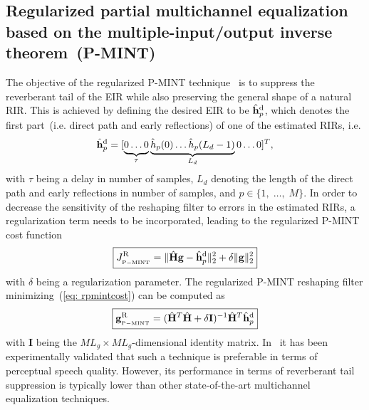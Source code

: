 \documentclass{article}
\begin{document}
\subsection{Regularized partial multichannel equalization based on the multiple-input/output inverse theorem~(P-MINT)}
The objective of the regularized P-MINT technique~\cite{Kodrasi_IWAENC_2012} is to suppress the reverberant tail of the EIR while also preserving the general shape of a natural RIR.
This is achieved by defining the desired EIR to be $\hat{\mathbf{h}}_p^{\rm d}$, which denotes the first part~(i.e. direct path and early reflections) of one of the estimated RIRs, i.e.
\begin{equation}
\hat{\mathbf{h}}_{p}^{\rm d} = [\underbrace{0\phantom{\rlap{$(L_d-1)$}} \ldots 0 }_{\tau} \underbrace{\hat{h}_p(0) \ldots \hat{h}_p(L_d-1)}_{L_d} 0 \ldots 0 ]^{T},
\end{equation}
with $\tau$ being a delay in number of samples, $L_d$ denoting the length of the direct path and early reflections in number of samples, and $p \in \{1, \; \ldots, \; M\}$.
In order to decrease the sensitivity of the reshaping filter to errors in the estimated RIRs, a regularization term needs to be incorporated, leading to the regularized P-MINT cost function
\begin{equation}
  \label{eq: rpmintcost}
  \boxed{J_{_{\rm P-MINT}}^{{\rm R}} = \|\hat{\mathbf{H}}\mathbf{g} - \hat{\mathbf{h}}_p^{\rm d}\|_2^2 + \delta \|\mathbf{g}\|_2^2}
\end{equation}
with $\delta$ being a regularization parameter.
The regularized P-MINT reshaping filter minimizing~(\ref{eq: rpmintcost}) can be computed as
\begin{equation}
  \label{eq: rpmintsol}
  \boxed{\mathbf{g}_{_{\rm P-MINT}}^{{\rm R}} = (\hat{\mathbf{H}}^T\hat{\mathbf{H}}+\delta \mathbf{I})^{-1} \hat{\mathbf{H}}^T \hat{\mathbf{h}}_p^{\rm d}}
\end{equation}
with $\mathbf{I}$ being the $ML_g \times ML_g$-dimensional identity matrix.
In~\cite{Kodrasi_IWAENC_2012} it has been experimentally validated that such a technique is preferable in terms of perceptual speech quality.
However, its performance in terms of reverberant tail suppression is typically lower than other state-of-the-art multichannel equalization techniques.
\end{document}
